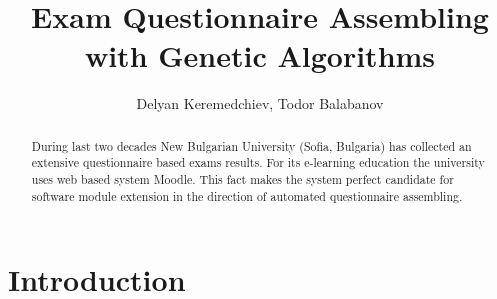 \documentclass{llncs}
\begin{document}
\title{Exam Questionnaire Assembling \\ with Genetic Algorithms}

\author{Delyan Keremedchiev, Todor Balabanov}




\maketitle


\begin{abstract}

During last two decades New Bulgarian University (Sofia, Bulgaria) has collected an extensive questionnaire based exams results. For its e-learning education the university uses web based system Moodle. This fact makes the system perfect candidate for software module extension in the direction of automated questionnaire assembling. 

\end{abstract}


\section{Introduction}
\end{document}
